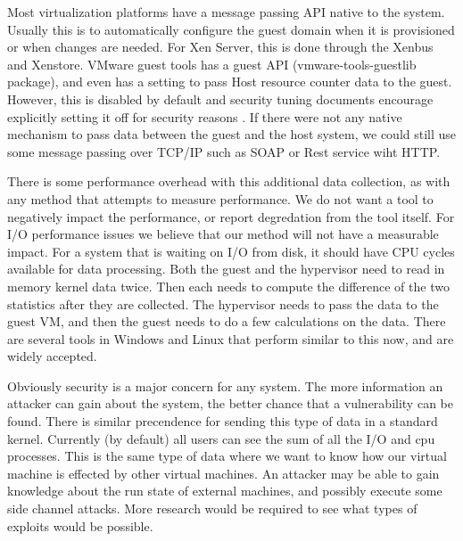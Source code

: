 Most virtualization platforms have a message passing API native to the system.  Usually this is to automatically configure the guest domain when it is provisioned or when changes are needed.  For Xen Server, this is done through the Xenbus and Xenstore.  VMware guest tools has a guest API (vmware-tools-guestlib package), and even has a setting to pass Host resource counter data to the guest.  However, this is disabled by default and security tuning documents encourage explicitly setting it off for security reasons \cite{vmwarepubs}.  If there were not any native mechanism to pass data between the guest and the host system, we could still use some message passing over TCP/IP such as SOAP or Rest service wiht HTTP.

There is some performance overhead with this additional data collection, as with any method that attempts to measure performance.  We do not want a tool to negatively impact the performance, or report degredation from the tool itself.  For I/O performance issues we believe that our method will not have a measurable impact.  For a system that is waiting on I/O from disk, it should have CPU cycles available for data processing.   Both the guest and the hypervisor need to read in memory kernel data twice.  Then each needs to compute the difference of the two statistics after they are collected.  The hypervisor needs to pass the data to the guest VM, and then the guest needs to do a few calculations on the data.  There are several tools in Windows and Linux that perform similar to this now, and are widely accepted.

Obviously security is a major concern for any system.  The more information an attacker can gain about the system, the better chance that a vulnerability can be found.  There is similar precendence for sending this type of data in a standard kernel.  Currently (by default) all users can see the sum of all the I/O and cpu processes.  This is the same type of data where we want to know how our virtual machine is effected by other virtual machines.  An attacker may be able to gain knowledge about the run state of external machines, and possibly execute some side channel attacks.  More research would be required to see what types of exploits would be possible.  

